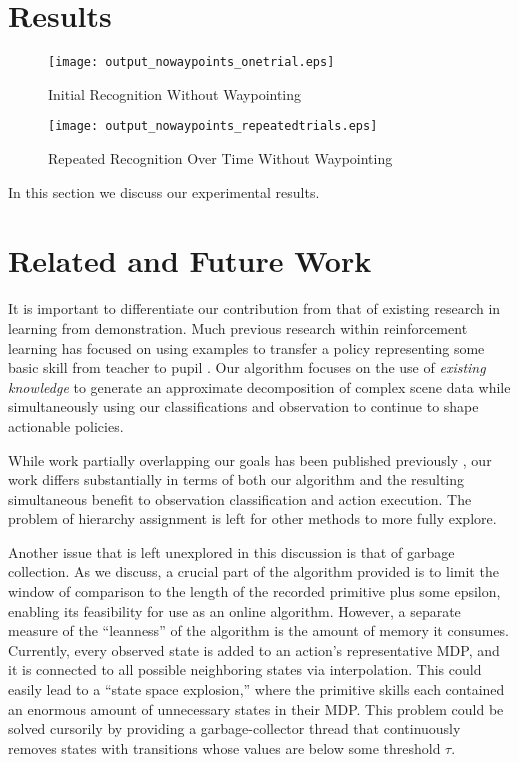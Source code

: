 \documentclass[letterpaper]{article}
\begin{document}
\section{Results}
\label{sec:result}

\begin{figure}
\begin{center}
\texttt{[image: output\_nowaypoints\_onetrial.eps]}
\caption{Initial Recognition Without Waypointing}
\label{fig:output_nowaypoints_onetrial}
\end{center}
\end{figure}

\begin{figure}
\begin{center}
\texttt{[image: output\_nowaypoints\_repeatedtrials.eps]}
\caption{Repeated Recognition Over Time Without Waypointing}
\label{fig:output_nowaypoints_repeatedtrials}
\end{center}
\end{figure}

In this section we discuss our experimental results.

\section{Related and Future Work}
\label{sec:future}
It is important to differentiate our contribution from that of
existing research in learning from demonstration.  Much previous research
within reinforcement learning has focused on using examples to
transfer a policy representing some basic skill from teacher to
pupil \cite{JenkinsLFD,LFDSurvey}.  Our algorithm focuses on the use of
\textit{existing knowledge} to generate an approximate decomposition of
complex scene data while simultaneously using our classifications and 
observation to continue to shape actionable policies.

While work partially overlapping our goals has been published previously
\cite{LearningBehaviorFusion}, our work differs substantially in terms of both
our algorithm and the resulting simultaneous benefit to observation
classification and action execution. The problem of hierarchy assignment is
left for other methods to more fully explore.

Another issue that is left unexplored in this discussion is that of garbage collection.  As we discuss, a crucial part of the algorithm provided is to limit the window of comparison to the length of the recorded primitive plus some epsilon, enabling its feasibility for use as an online algorithm.  However, a separate measure of the ``leanness'' of the algorithm is the amount of memory it consumes.  Currently, every observed state is added to an action's representative MDP, and it is connected to all possible neighboring states via interpolation.  This could easily lead to a ``state space explosion,'' where the primitive skills each contained an enormous amount of unnecessary states in their MDP.  This problem could be solved cursorily by providing a garbage-collector thread that continuously removes states with transitions whose values are below some threshold $\tau$.
\end{document}
